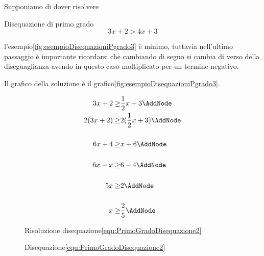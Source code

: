 Supponiamo di dover risolvere 
\begin{esempiot}{Disequazione di primo grado}{}
\begin{equation}
3x+2>4x+3\label{equ:PrimoGradoDisequazione3}
\end{equation}
\end{esempiot}
 l'esempio\nobs\vref{fig:esempioDisequazioniPgrado3} è minimo, tuttavia nell'ultimo passaggio è importante ricordarsi che cambiando di segno si cambia di verso della diseguaglianza  avendo in questo caso moltiplicato per un termine negativo.\par
Il grafico della soluzione è il grafico\nobs\vref{fig:esempioDisequazioniPgrado3}.  
\begin{figure}
	 
\begin{NodesList}
\begin{align*}
	3x+2\geq&\dfrac{1}{2}x+3\AddNode\\
	2(3x+2)\geq&2(\dfrac{1}{2}x+3)\AddNode\\[.5cm] %
	6x+4\geq&x+6\AddNode\\[.5cm]
	6x-x\geq&6-4\AddNode\\[.5cm]
	5x\geq&2\AddNode\\[.5cm]
	x\geq&\dfrac{2}{5}\AddNode
\end{align*}
%
%
%
\end{NodesList}
\captionsetup{format=esempio,list=no}\caption{Risoluzione disequazione\nobs\vref{equ:PrimoGradoDisequazione2}}
\label{fig:esempioDisequazioniPgrado2}
\end{figure}
\begin{figure}
	\centering
	\captionsetup{format=grafico,list=no}
	\caption{Disequazione\nobs\vref{equ:PrimoGradoDisequazione2}}
	\label{fig:esempioDisequazioniPgradografico2}
\end{figure}
